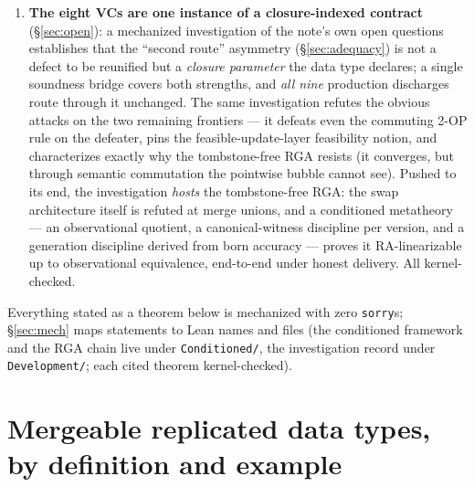 \documentclass[11pt]{article}
\newcommand{\lean}[1]{\texttt{#1}}
\begin{document}
\begin{enumerate}[leftmargin=2em]
  increment-only and PN counters, a tombstone RGA, Peritext, the
  multi-valued register and the add-wins priority queue --- are
  discharged end-to-end, kernel-checked; the twelfth, the tombstone-free
  RGA, goes through the conditioned framework. The sweep produces an empirical
  \emph{class map} of which data types need which strength of contract,
  with two surprises: tombstones are a metatheoretic trivializer, and
  commutativity class and delta class are independent axes.
\item \textbf{The eight VCs are one instance of a closure-indexed
  contract} (\S\ref{sec:open}): a mechanized investigation of the note's
  own open questions establishes that the ``second route'' asymmetry
  (\S\ref{sec:adequacy}) is not a defect to be reunified but a
  \emph{closure parameter} the data type declares; a single soundness
  bridge covers both strengths, and \emph{all nine} production discharges
  route through it unchanged. The same investigation refutes the obvious
  attacks on the two remaining frontiers --- it defeats even the commuting
  \textsc{2-OP} rule on the defeater, pins the feasible-update-layer
  feasibility notion, and characterizes exactly why the tombstone-free RGA
  resists (it converges, but through semantic commutation the pointwise
  bubble cannot see). Pushed to its end, the investigation \emph{hosts}
  the tombstone-free RGA: the swap architecture itself is refuted at merge
  unions, and a conditioned metatheory --- an observational quotient, a
  canonical-witness discipline per version, and a generation discipline
  derived from born accuracy --- proves it RA-linearizable up to
  observational equivalence, end-to-end under honest delivery. All
  kernel-checked.
\end{enumerate}

Everything stated as a theorem below is mechanized with zero
\lean{sorry}s; \S\ref{sec:mech} maps statements to Lean names and files
(the conditioned framework and the RGA chain live under
\lean{Conditioned/}, the investigation record under \lean{Development/};
each cited theorem kernel-checked).


\section{Mergeable replicated data types, by definition and example}
\label{sec:mrdts}
\end{document}
